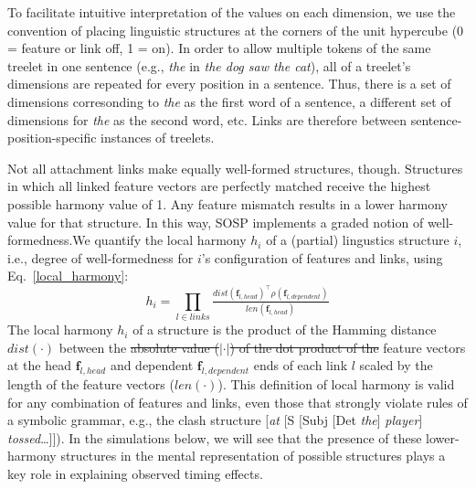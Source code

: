 \documentclass[10pt,letterpaper]{article}
\begin{document}
To facilitate intuitive interpretation of the values on each dimension, we use the convention of placing linguistic structures at the corners of the unit hypercube (0 = feature or link off, 1 = on). In order to allow multiple tokens of the same treelet in one sentence (e.g., \emph{the} in \emph{the dog saw the cat}), all of a treelet's dimensions are repeated for every position in a sentence. Thus, there is a set of dimensions corresonding to \emph{the} as the first word of a sentence, a different set of dimensions for \emph{the} as the second word, etc. Links are therefore between sentence-position-specific instances of treelets. 

Not all attachment links make equally well-formed structures, though. Structures in which all linked feature vectors are perfectly matched receive the highest possible harmony value of 1. Any feature mismatch results in a lower harmony value for that structure. In this way, SOSP implements a graded notion of well-formedness.We quantify the local harmony $h_i$ of a (partial) lingustics structure $i$, i.e., degree of well-formedness for $i$'s configuration of features and links, using Eq.~\ref{local_harmony}:%
\begin{equation}\label{local_harmony}
h_i = \prod_{l\in links}  \tfrac{dist(\mathbf{f}_{l, head})^\intercal \rho(\mathbf{f}_{l, dependent})}{len(\mathbf{f}_{l, head})}
\end{equation}
The local harmony $h_i$ of a structure is the product of the Hamming distance $dist(\cdot)$  between the \sout{absolute value ($\vert\cdot\vert$) of the dot product of the} feature vectors at the head $\mathbf{f}_{l, head}$ and dependent $\mathbf{f}_{l, dependent}$ ends of each link $l$ scaled by the length of the feature vectors ($len(\cdot)$). %
This definition of local harmony is valid for any combination of features and links, even those that strongly violate rules of a symbolic grammar, e.g., the clash structure [\emph{at} [S [Subj [Det \emph{the}] \emph{player}] \emph{tossed}\dots]]). In the simulations below, we will see that the presence of these lower-harmony structures in the mental representation of possible structures plays a key role in explaining observed timing effects.
\end{document}
